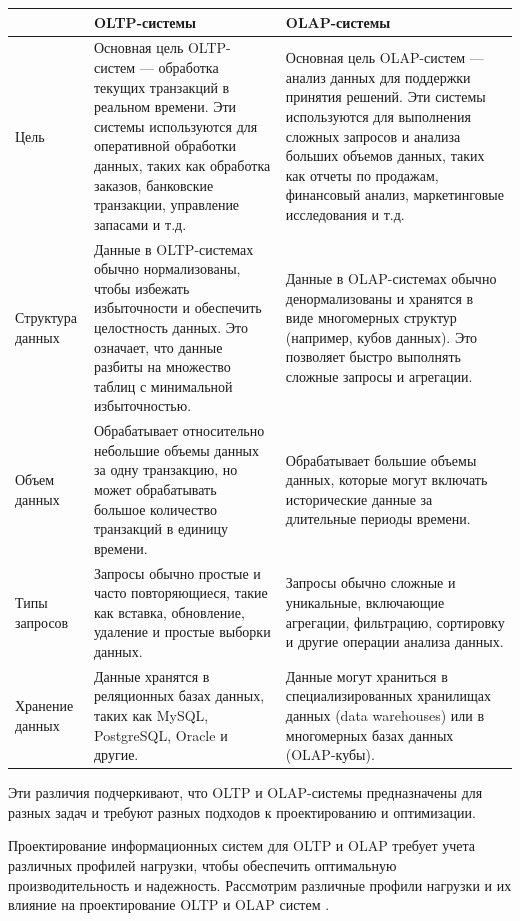 \begin{table}[!ht]
	\centering
	\begin{tabular}{|m{4cm}|m{6cm}|m{6cm}|}
		\hline
		 ~ &\textbf{OLTP-системы} & \textbf{OLAP-системы} \\ 
		\hline
		Цель & Основная цель OLTP-систем — обработка текущих транзакций в реальном времени. Эти системы используются для оперативной обработки данных, таких как обработка заказов, банковские транзакции, управление запасами и т.д. & Основная цель OLAP-систем — анализ данных для поддержки принятия решений. Эти системы используются для выполнения сложных запросов и анализа больших объемов данных, таких как отчеты по продажам, финансовый анализ, маркетинговые исследования и т.д. \\ 
		\hline
		Структура данных & Данные в OLTP-системах обычно нормализованы, чтобы избежать избыточности и обеспечить целостность данных. Это означает, что данные разбиты на множество таблиц с минимальной избыточностью. & Данные в OLAP-системах обычно денормализованы и хранятся в виде многомерных структур (например, кубов данных). Это позволяет быстро выполнять сложные запросы и агрегации. \\ 
		\hline
		Объем данных & Обрабатывает относительно небольшие объемы данных за одну транзакцию, но может обрабатывать большое количество транзакций в единицу времени. & Обрабатывает большие объемы данных, которые могут включать исторические данные за длительные периоды времени.\\ 
		\hline
		Типы запросов &  Запросы обычно простые и часто повторяющиеся, такие как вставка, обновление, удаление и простые выборки данных. &Запросы обычно сложные и уникальные, включающие агрегации, фильтрацию, сортировку и другие операции анализа данных. \\ 
		\hline
		Хранение данных &  Данные хранятся в реляционных базах данных, таких как MySQL, PostgreSQL, Oracle и другие. & Данные могут храниться в специализированных хранилищах данных (data warehouses) или в многомерных базах данных (OLAP-кубы).\\ 
		\hline
	\end{tabular}
\end{table}

Эти различия подчеркивают, что OLTP и OLAP-системы предназначены для разных задач и требуют разных подходов к проектированию и оптимизации.

Проектирование информационных систем для OLTP и OLAP требует учета различных профилей нагрузки, чтобы обеспечить оптимальную производительность и надежность. Рассмотрим различные профили нагрузки и их влияние на проектирование OLTP и OLAP систем \autocite{OLAP_OLTP}.


